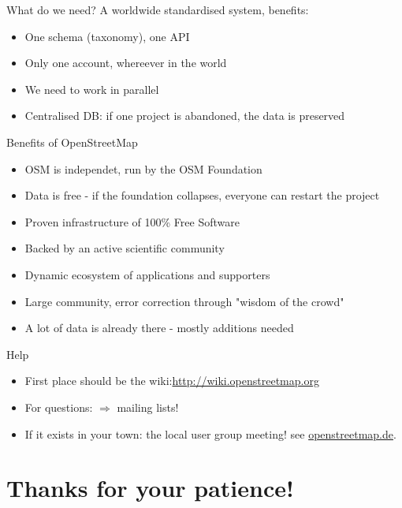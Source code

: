 \documentclass{beamer}
\begin{document}
\begin{frame}{What do we need?}
	A worldwide standardised system, benefits:
\begin{itemize}
  \item One schema (taxonomy), one API
  \item Only one account, whereever in the world
  \item We need to work in parallel
  \item Centralised DB: if one project is abandoned, the data is preserved
\end{itemize}
\end{frame}

\begin{frame}{Benefits of OpenStreetMap}

\begin{itemize}
  \item OSM is independet, run by the OSM Foundation
  \item Data is free - if the foundation collapses, everyone can restart the project
  \item Proven infrastructure of 100\% Free Software
  \item Backed by an active scientific community
  \item Dynamic ecosystem of applications and supporters
  \item Large community, error correction through "wisdom of the crowd"
  \item A lot of data is already there - mostly additions needed
\end{itemize}

\end{frame}


\begin{frame}{Help}

\begin{itemize}
  \item First place should be the wiki:\url{http://wiki.openstreetmap.org}
  \item For questions: $\Rightarrow$ mailing lists!
\item If it exists in your town: the local user group meeting! see \href{http://usergroups.openstreetmap.de/}{openstreetmap.de}.
\end{itemize}

\end{frame}

\section{Thanks for your patience!}
\end{document}
